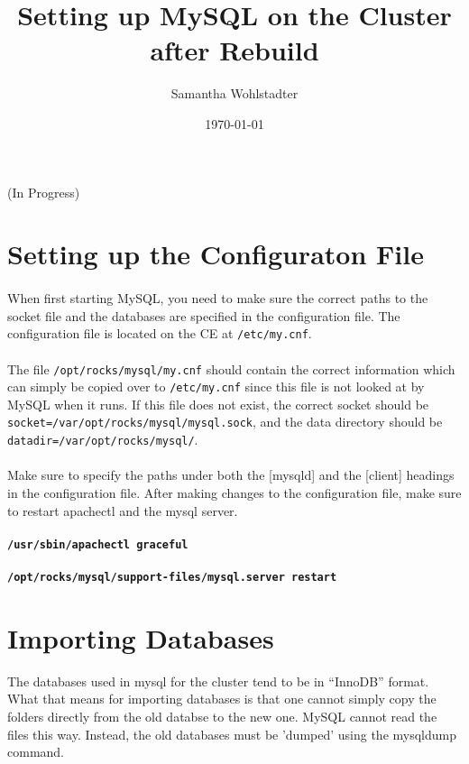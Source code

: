\documentclass[12pt]{article}
\begin{document}
\title{Setting up MySQL on the Cluster after Rebuild}
\date{\today}
\author{Samantha Wohlstadter}
\thispagestyle{empty}
\maketitle

(In Progress)

\section{Setting up the Configuraton File}

\paragraph{} When first starting MySQL, you need to make sure the correct paths to the socket file and the databases are specified in the configuration file. The configuration file  is located on the CE at {\tt /etc/my.cnf}.
\paragraph{}
The file {\tt /opt/rocks/mysql/my.cnf} should contain the correct information which can simply be copied over to {\tt /etc/my.cnf} since this file is not looked at by MySQL when it runs. If this file does not exist, the correct socket should be {\tt socket=/var/opt/rocks/mysql/mysql.sock}, and the data directory should be {\tt datadir=/var/opt/rocks/mysql/}.

\paragraph{} Make sure to specify the paths under both the [mysqld] and the [client] headings in the configuration file. 
 After making changes to the configuration file, make sure to restart apachectl and the mysql server.
 \paragraph
     {\tt /usr/sbin/apachectl graceful}
\paragraph
    {\tt /opt/rocks/mysql/support-files/mysql.server restart }

\section{Importing Databases}
The databases used in mysql for the cluster tend to be in ``InnoDB'' format. What that means for importing databases is that one cannot simply copy the folders directly from the old databse to the new one. MySQL cannot read the files this way. Instead, the old databases must be 'dumped' using the mysqldump command.
\end{document}
